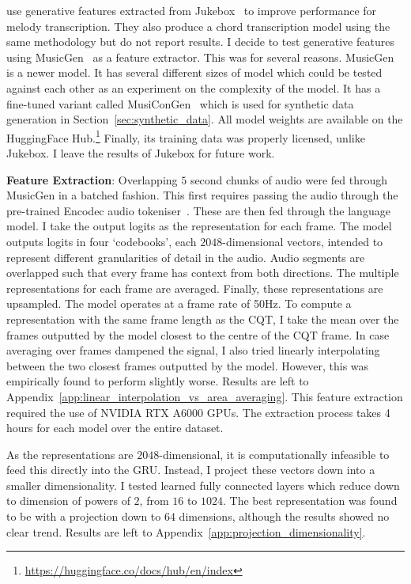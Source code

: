 \citet{MelodyTranscriptionViaGenerativePreTraining} use generative features extracted from Jukebox~\citep{Jukebox} to improve performance for melody transcription. They also produce a chord transcription model using the same methodology but do not report results. I decide to test generative features using MusicGen~\citep{MusicGen} as a feature extractor. This was for several reasons. MusicGen is a newer model. It has several different sizes of model which could be tested against each other as an experiment on the complexity of the model. It has a fine-tuned variant called MusiConGen~\citep{MusiConGen} which is used for synthetic data generation in Section~\ref{sec:synthetic_data}. All model weights are available on the HuggingFace Hub.\footnote{\url{https://huggingface.co/docs/hub/en/index}} Finally, its training data was properly licensed, unlike Jukebox. I leave the results of Jukebox for future work.

\textbf{Feature Extraction}: Overlapping $5$ second chunks of audio were fed through MusicGen in a batched fashion. This first requires passing the audio through the pre-trained Encodec audio tokeniser~\citep{Encodec}. These are then fed through the language model. I take the output logits as the representation for each frame. The model outputs logits in four `codebooks', each $2048$-dimensional vectors, intended to represent different granularities of detail in the audio. Audio segments are overlapped such that every frame has context from both directions. The multiple representations for each frame are averaged. Finally, these representations are upsampled. The model operates at a frame rate of 50Hz. To compute a representation with the same frame length as the CQT, I take the mean over the frames outputted by the model closest to the centre of the CQT frame. In case averaging over frames dampened the signal, I also tried linearly interpolating between the two closest frames outputted by the model. However, this was empirically found to perform slightly worse. Results are left to Appendix~\ref{app:linear_interpolation_vs_area_averaging}. This feature extraction required the use of NVIDIA RTX A6000 GPUs. The extraction process takes 4 hours for each model over the entire dataset.

As the representations are $2048$-dimensional, it is computationally infeasible to feed this directly into the GRU. Instead, I project these vectors down into a smaller dimensionality. I tested learned fully connected layers which reduce down to dimension of powers of $2$, from $16$ to $1024$. The best representation was found to be with a projection down to $64$ dimensions, although the results showed no clear trend. Results are left to Appendix~\ref{app:projection_dimensionality}.


